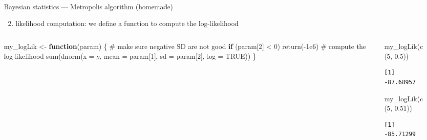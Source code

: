 \documentclass[
  ignorenonframetext,
  aspectratio=169,
  t]{beamer}
\newenvironment{Shaded}{\begin{snugshade}}{\end{snugshade}}
\newcommand{\AttributeTok}[1]{\textcolor[rgb]{0.40,0.45,0.13}{#1}}
\newcommand{\CommentTok}[1]{\textcolor[rgb]{0.37,0.37,0.37}{#1}}
\newcommand{\ConstantTok}[1]{\textcolor[rgb]{0.56,0.35,0.01}{#1}}
\newcommand{\ControlFlowTok}[1]{\textcolor[rgb]{0.00,0.23,0.31}{\textbf{#1}}}
\newcommand{\DecValTok}[1]{\textcolor[rgb]{0.68,0.00,0.00}{#1}}
\newcommand{\FloatTok}[1]{\textcolor[rgb]{0.68,0.00,0.00}{#1}}
\newcommand{\FunctionTok}[1]{\textcolor[rgb]{0.28,0.35,0.67}{#1}}
\newcommand{\NormalTok}[1]{\textcolor[rgb]{0.00,0.23,0.31}{#1}}
\newcommand{\OtherTok}[1]{\textcolor[rgb]{0.00,0.23,0.31}{#1}}
\newcommand{\SpecialCharTok}[1]{\textcolor[rgb]{0.37,0.37,0.37}{#1}}
\providecommand{\tightlist}{%
  \setlength{\itemsep}{0pt}\setlength{\parskip}{0pt}}
\newcommand{\bluenorm}[1]{\textcolor{bluebeamer}{#1}}
\begin{document}
\begin{frame}[fragile]{Bayesian statistics --- Metropolis algorithm
(homemade)}
\protect{}\label{bayesian-statistics-metropolis-algorithm-homemade-1}
\begin{enumerate}
\setcounter{enumi}{1}
\tightlist
\item
  \bluenorm{likelihood computation}: we define a function to compute the
  log-likelihood
\end{enumerate}

\begin{columns}[T]
\begin{column}{0.5\linewidth}
\footnotesize

\begin{Shaded}
\begin{Highlighting}[]
\NormalTok{my\_logLik }\OtherTok{\textless{}{-}} \ControlFlowTok{function}\NormalTok{(param) \{}
  \CommentTok{\# make sure negative SD are not good}
  \ControlFlowTok{if}\NormalTok{ (param[}\DecValTok{2}\NormalTok{] }\SpecialCharTok{\textless{}} \DecValTok{0}\NormalTok{) }\FunctionTok{return}\NormalTok{(}\SpecialCharTok{{-}}\FloatTok{1e6}\NormalTok{)}
  \CommentTok{\# compute the log{-}likelihood}
  \FunctionTok{sum}\NormalTok{(}\FunctionTok{dnorm}\NormalTok{(}\AttributeTok{x =}\NormalTok{ y,}
            \AttributeTok{mean =}\NormalTok{ param[}\DecValTok{1}\NormalTok{],}
            \AttributeTok{sd =}\NormalTok{ param[}\DecValTok{2}\NormalTok{],}
            \AttributeTok{log =} \ConstantTok{TRUE}\NormalTok{))}
\NormalTok{\}}
\end{Highlighting}
\end{Shaded}

\normalsize
\end{column}

\begin{column}{0.5\linewidth}
\footnotesize

\begin{Shaded}
\begin{Highlighting}[]
\FunctionTok{my\_logLik}\NormalTok{(}\FunctionTok{c}\NormalTok{(}\DecValTok{5}\NormalTok{, }\FloatTok{0.5}\NormalTok{))}
\end{Highlighting}
\end{Shaded}

\begin{verbatim}
[1] -87.68957
\end{verbatim}

\begin{Shaded}
\begin{Highlighting}[]
\FunctionTok{my\_logLik}\NormalTok{(}\FunctionTok{c}\NormalTok{(}\DecValTok{5}\NormalTok{, }\FloatTok{0.51}\NormalTok{))}
\end{Highlighting}
\end{Shaded}

\begin{verbatim}
[1] -85.71299
\end{verbatim}

\normalsize
\end{column}
\end{columns}
\end{frame}
\end{document}
